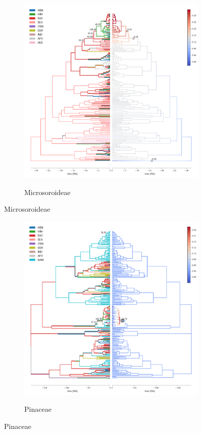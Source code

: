 \begin{figure}
  \ContinuedFloat
\begin{subfigure}{\textwidth}
\centering
\includegraphics[width=.99\linewidth]{figures/Microsoroideae-supfig.pdf}
\label{fig:allium}
\caption{Microsoroideae}
\end{subfigure}
\end{figure}

\begin{figure}
  \ContinuedFloat
\begin{subfigure}{\textwidth}
\centering
\includegraphics[width=.99\linewidth]{figures/Pinaceae-supfig.pdf}
\label{fig:allium}
\caption{Pinaceae}
\end{subfigure}
\end{figure}

